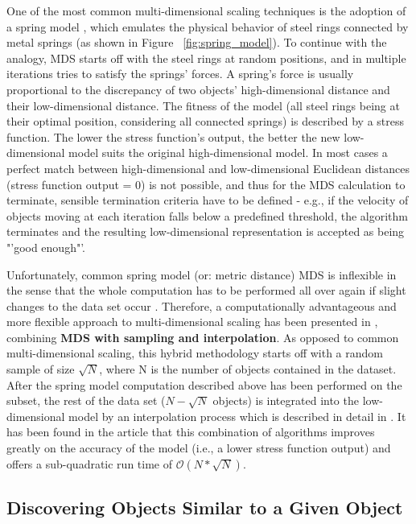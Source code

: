 One of the most common multi-dimensional scaling techniques is the adoption of a spring model \cite{Morrison:2003:FMS}, which emulates the physical behavior of steel rings connected by metal springs (as shown in Figure ~\ref{fig:spring_model}). To continue with the analogy, MDS starts off with the steel rings at random positions, and in multiple iterations tries to satisfy the springs' forces. A spring's force is usually proportional to the discrepancy of two objects' high-dimensional distance and their low-dimensional distance. The fitness of the model (all steel rings being at their optimal position, considering all connected springs) is described by a stress function. The lower the stress function's output, the better the new low-dimensional model suits the original high-dimensional model. In most cases a perfect match between high-dimensional and low-dimensional Euclidean distances (stress function output = 0) is not possible, and thus for the MDS calculation to terminate, sensible termination criteria have to be defined - e.g., if the velocity of objects moving at each iteration falls below a predefined threshold, the algorithm terminates and the resulting low-dimensional representation is accepted as being "'good enough"'.

Unfortunately, common spring model (or: metric distance) MDS is inflexible in the sense that the whole computation has to be performed all over again if slight changes to the data set occur \cite{Morrison:2003:FMS}. 
Therefore, a computationally advantageous and more flexible approach to multi-dimensional scaling has been presented in \cite{Morrison:2003:FMS}, combining \textbf{MDS with sampling and interpolation}. As opposed to common multi-dimensional
scaling, this hybrid methodology starts off with a random sample of size $\sqrt{N}$, where N is the number of objects contained in the dataset. After the spring model computation described above has been performed on the subset, the rest of the data set ($N - \sqrt{N}$ objects) is integrated into the low-dimensional model by an interpolation process which is described in detail in \cite{Morrison:2003:FMS}. It has been found in the article that this combination of algorithms improves greatly on the accuracy of the model (i.e., a lower stress function output) and offers a sub-quadratic run time of $\mathcal O(N*\sqrt{N})$.

\subsection{Discovering Objects Similar to a Given Object}

